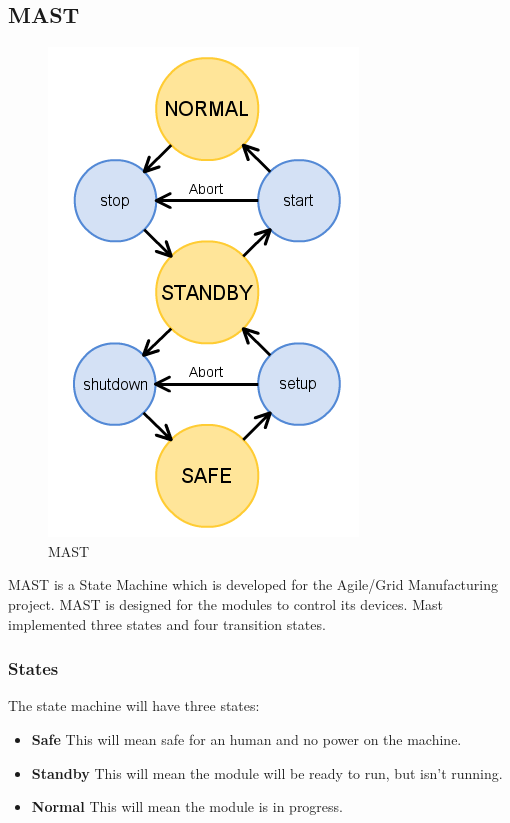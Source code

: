 \documentclass[12pt,a4paper]{report}
\begin{document}
\subsection{MAST}
\begin{figure}
	\begin{center}
		\includegraphics[scale=0.5]{mast.png}
	\caption{MAST}
	\end{center}
	\vspace{-100pt}
\end{figure}
MAST is a State Machine which is developed for the Agile/Grid Manufacturing project. MAST is designed for the modules to control its devices. Mast implemented three states and four transition states.
\subsubsection{States}
The state machine will have three states:
\begin{itemize}
\item \textbf{Safe} This will mean safe for an human and no power on the machine.
\item \textbf{Standby} This will mean the module will be ready to run, but isn’t running.
\item \textbf{Normal} This will mean the module is in progress.
\end{itemize}
\end{document}
